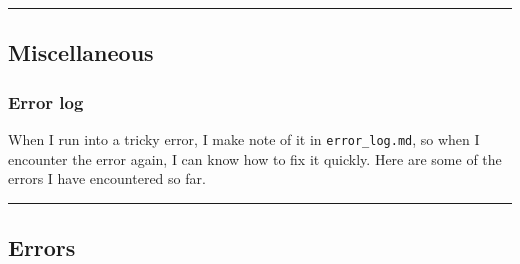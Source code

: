 \documentclass[]{article}
\begin{document}
\begin{center}\rule{0.5\linewidth}{\linethickness}\end{center}

\hypertarget{misc}{\subsection{Miscellaneous}\label{misc}}

\hypertarget{error-log}{\subsubsection{Error log}\label{error-log}}

When I run into a tricky error, I make note of it in
\texttt{error\_log.md}, so when I encounter the error again, I can know
how to fix it quickly. Here are some of the errors I have encountered so
far.

\begin{center}\rule{0.5\linewidth}{\linethickness}\end{center}

\subsection{Errors}\label{errors}
\end{document}

